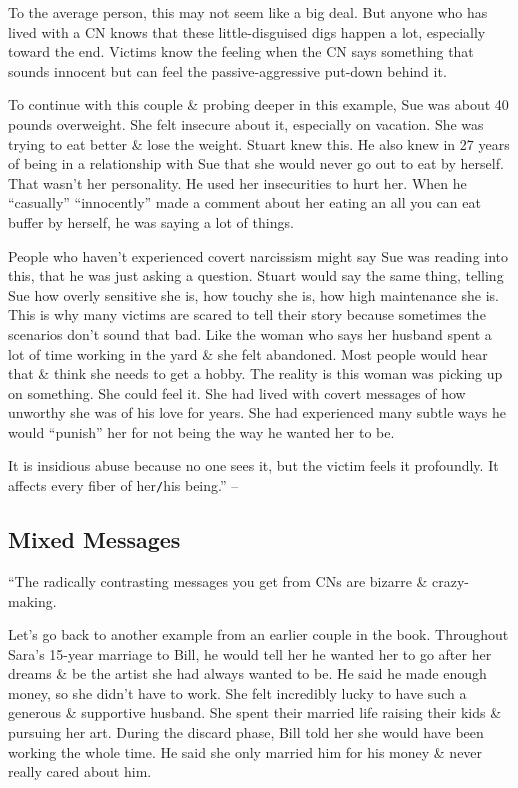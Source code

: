 \documentclass{article}
\numberwithin{equation}{section}
\begin{document}
To the average person, this may not seem like a big deal. But anyone who has lived with a CN knows that these little-disguised digs happen a lot, especially toward the end. Victims know the feeling when the CN says something that sounds innocent but can feel the passive-aggressive put-down behind it.

To continue with this couple \& probing deeper in this example, Sue was about 40 pounds overweight. She felt insecure about it, especially on vacation. She was trying to eat better \& lose the weight. Stuart knew this. He also knew in 27 years of being in a relationship with Sue that she would never go out to eat by herself. That wasn't her personality. He used her insecurities to hurt her. When he ``casually'' ``innocently'' made a comment about her eating an all you can eat buffer by herself, he was saying a lot of things.

People who haven't experienced covert narcissism might say Sue was reading into this, that he was just asking a question. Stuart would say the same thing, telling Sue how overly sensitive she is, how touchy she is, how high maintenance she is. This is why many victims are scared to tell their story because sometimes the scenarios don't sound that bad. Like the woman who says her husband spent a lot of time working in the yard \& she felt abandoned. Most people would hear that \& think she needs to get a hobby. The reality is this woman was picking up on something. She could feel it. She had lived with covert messages of how unworthy she was of his love for years. She had experienced many subtle ways he would ``punish'' her for not being the way he wanted her to be.

It is insidious abuse because no one sees it, but the victim feels it profoundly. It affects every fiber of her\texttt{/}his being.'' -- \cite[pp. 84--86]{Mirza2017}

\subsection{Mixed Messages}
``The radically contrasting messages you get from CNs are bizarre \& crazy-making.

Let's go back to another example from an earlier couple in the book. Throughout Sara's 15-year marriage to Bill, he would tell her he wanted her to go after her dreams \& be the artist she had always wanted to be. He said he made enough money, so she didn't have to work. She felt incredibly lucky to have such a generous \& supportive husband. She spent their married life raising their kids \& pursuing her art. During the discard phase, Bill told her she would have been working the whole time. He said she only married him for his money \& never really cared about him.
\end{document}
